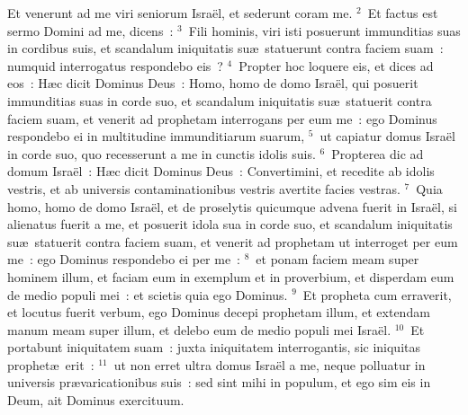 \lettrine[lines=10,image=true,loversize=0.05,lraise=-0.03]{E}{}t venerunt ad me viri seniorum Isra\"el, et sederunt coram me.
${}^{2}$~Et factus est sermo Domini ad me, dicens~:
${}^{3}$~Fili hominis, viri isti posuerunt immunditias suas in cordibus suis, et scandalum iniquitatis su\ae\ statuerunt contra faciem suam~: numquid interrogatus respondebo eis~?
${}^{4}$~Propter hoc loquere eis, et dices ad eos~: H\ae c dicit Dominus Deus~: Homo, homo de domo Isra\"el, qui posuerit immunditias suas in corde suo, et scandalum iniquitatis su\ae\ statuerit contra faciem suam, et venerit ad prophetam interrogans per eum me~: ego Dominus respondebo ei in multitudine immunditiarum suarum,
${}^{5}$~ut capiatur domus Isra\"el in corde suo, quo recesserunt a me in cunctis idolis suis.
${}^{6}$~Propterea dic ad domum Isra\"el~: H\ae c dicit Dominus Deus~: Convertimini, et recedite ab idolis vestris, et ab universis contaminationibus vestris avertite facies vestras.
${}^{7}$~Quia homo, homo de domo Isra\"el, et de proselytis quicumque advena fuerit in Isra\"el, si alienatus fuerit a me, et posuerit idola sua in corde suo, et scandalum iniquitatis su\ae\ statuerit contra faciem suam, et venerit ad prophetam ut interroget per eum me~: ego Dominus respondebo ei per me~:
${}^{8}$~et ponam faciem meam super hominem illum, et faciam eum in exemplum et in proverbium, et disperdam eum de medio populi mei~: et scietis quia ego Dominus.
${}^{9}$~Et propheta cum erraverit, et locutus fuerit verbum, ego Dominus decepi prophetam illum, et extendam manum meam super illum, et delebo eum de medio populi mei Isra\"el.
${}^{10}$~Et portabunt iniquitatem suam~: juxta iniquitatem interrogantis, sic iniquitas prophet\ae\ erit~:
${}^{11}$~ut non erret ultra domus Isra\"el a me, neque polluatur in universis pr\ae varicationibus suis~: sed sint mihi in populum, et ego sim eis in Deum, ait Dominus exercituum.


